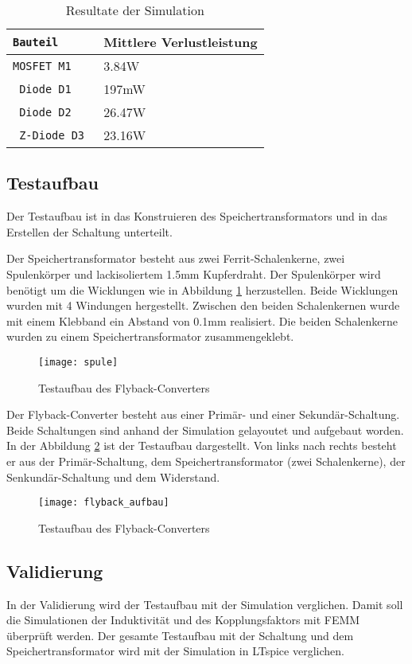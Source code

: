 \begin{table}[h]
	\centering
	\begin{tabular}{>{\tt}C{2.3cm}| C{6cm}} 
		\normalfont\textbf{Bauteil} & \normalfont\textbf{Mittlere Verlustleistung} \\ \hline\hline 
		MOSFET M1 & 3.84W  \\ \hline
		Diode D1 & 197mW  \\ \hline
		Diode D2 & 26.47W \\ \hline
		Z-Diode D3 & 23.16W  \\ \hline
	\end{tabular}
	\caption{Resultate der Simulation}
	\label{tab:LT_verlsutleistung}
\end{table}
\newpage
\subsection{Testaufbau}
Der Testaufbau ist in das Konstruieren des Speichertransformators und in das Erstellen der Schaltung unterteilt. 

Der Speichertransformator besteht aus zwei Ferrit-Schalenkerne, zwei Spulenkörper und  lackisoliertem 1.5mm Kupferdraht. Der Spulenkörper wird benötigt um die Wicklungen wie in Abbildung \ref{fig:aufbau_spule} herzustellen. Beide Wicklungen wurden mit 4 Windungen hergestellt.
Zwischen den beiden Schalenkernen wurde mit einem Klebband ein Abstand von 0.1mm realisiert. Die beiden Schalenkerne wurden zu einem Speichertransformator zusammengeklebt.

\begin{figure}[H]
	\centering
	\texttt{[image: spule]}
	\caption{Testaufbau des Flyback-Converters}\label{fig:aufbau_spule}
\end{figure}

Der Flyback-Converter besteht aus einer Primär- und einer Sekundär-Schaltung. Beide Schaltungen sind anhand der Simulation gelayoutet und aufgebaut worden. In der Abbildung \ref{fig:testaufbau} ist der Testaufbau dargestellt. Von links nach rechts besteht er aus der Primär-Schaltung, dem Speichertransformator (zwei Schalenkerne), der Senkundär-Schaltung und dem Widerstand.

\begin{figure}[H]
	\centering
	\texttt{[image: flyback\_aufbau]}
	\caption{Testaufbau des Flyback-Converters}\label{fig:testaufbau}
\end{figure}
\newpage
\subsection{Validierung}
In der Validierung wird der Testaufbau mit der Simulation verglichen. Damit soll die Simulationen der Induktivität und des Kopplungsfaktors mit FEMM  überprüft werden. Der gesamte Testaufbau mit der Schaltung und dem Speichertransformator wird mit der Simulation in LTspice verglichen.

